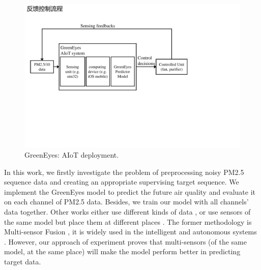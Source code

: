 \documentclass[sigconf]{acmart}
\begin{document}
\begin{figure}[!htbp]
    \begin{center}
    \includegraphics[width=\linewidth]{fig/aiot/greeneyes_aiot.pdf}
    \end{center}
    \caption{GreenEyes: AIoT deployment.}
    \label{fig:greeneyes_aiot}
\end{figure}

In this work, we firstly investigate the problem of preprocessing noisy PM2.5 sequence data and creating an appropriate supervising target sequence. We implement the GreenEyes model to predict the future air quality and evaluate it on each channel of PM2.5 data. Besides, we train our model with all channels' data together. Other works either use different kinds of data \cite{han2020joint}, or use sensors of the same model but place them at different places \cite{ray2016internet}. The former methodology is Multi-sensor Fusion \cite{wang2019multi}, it is widely used in the intelligent and autonomous systems \cite{luo1989multisensor, hall1997introduction, wang2012towards, cai2020probabilistic}. However, our approach of experiment proves that multi-sensors (of the same model, at the same place) will make the model perform better in predicting target data.
\end{document}
